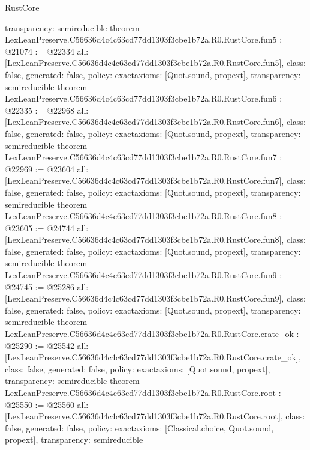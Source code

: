 \begin{lexlean}{RustCore}
\begin{coremodule}
{  transparency: semireducible
}
theorem LexLeanPreserve.C56636d4c4c63cd77dd1303f3cbe1b72a.R0.RustCore.fun5 : @21074 := @22334 {
  all: [LexLeanPreserve.C56636d4c4c63cd77dd1303f3cbe1b72a.R0.RustCore.fun5],
  class: false,
  generated: false,
  policy: exact{axioms: [Quot.sound, propext]},
  transparency: semireducible
}
theorem LexLeanPreserve.C56636d4c4c63cd77dd1303f3cbe1b72a.R0.RustCore.fun6 : @22335 := @22968 {
  all: [LexLeanPreserve.C56636d4c4c63cd77dd1303f3cbe1b72a.R0.RustCore.fun6],
  class: false,
  generated: false,
  policy: exact{axioms: [Quot.sound, propext]},
  transparency: semireducible
}
theorem LexLeanPreserve.C56636d4c4c63cd77dd1303f3cbe1b72a.R0.RustCore.fun7 : @22969 := @23604 {
  all: [LexLeanPreserve.C56636d4c4c63cd77dd1303f3cbe1b72a.R0.RustCore.fun7],
  class: false,
  generated: false,
  policy: exact{axioms: [Quot.sound, propext]},
  transparency: semireducible
}
theorem LexLeanPreserve.C56636d4c4c63cd77dd1303f3cbe1b72a.R0.RustCore.fun8 : @23605 := @24744 {
  all: [LexLeanPreserve.C56636d4c4c63cd77dd1303f3cbe1b72a.R0.RustCore.fun8],
  class: false,
  generated: false,
  policy: exact{axioms: [Quot.sound, propext]},
  transparency: semireducible
}
theorem LexLeanPreserve.C56636d4c4c63cd77dd1303f3cbe1b72a.R0.RustCore.fun9 : @24745 := @25286 {
  all: [LexLeanPreserve.C56636d4c4c63cd77dd1303f3cbe1b72a.R0.RustCore.fun9],
  class: false,
  generated: false,
  policy: exact{axioms: [Quot.sound, propext]},
  transparency: semireducible
}
theorem LexLeanPreserve.C56636d4c4c63cd77dd1303f3cbe1b72a.R0.RustCore.crate_ok : @25290 := @25542 {
  all: [LexLeanPreserve.C56636d4c4c63cd77dd1303f3cbe1b72a.R0.RustCore.crate_ok],
  class: false,
  generated: false,
  policy: exact{axioms: [Quot.sound, propext]},
  transparency: semireducible
}
theorem LexLeanPreserve.C56636d4c4c63cd77dd1303f3cbe1b72a.R0.RustCore.root : @25550 := @25560 {
  all: [LexLeanPreserve.C56636d4c4c63cd77dd1303f3cbe1b72a.R0.RustCore.root],
  class: false,
  generated: false,
  policy: exact{axioms: [Classical.choice, Quot.sound, propext]},
  transparency: semireducible
}


\end{coremodule}
\end{lexlean}
